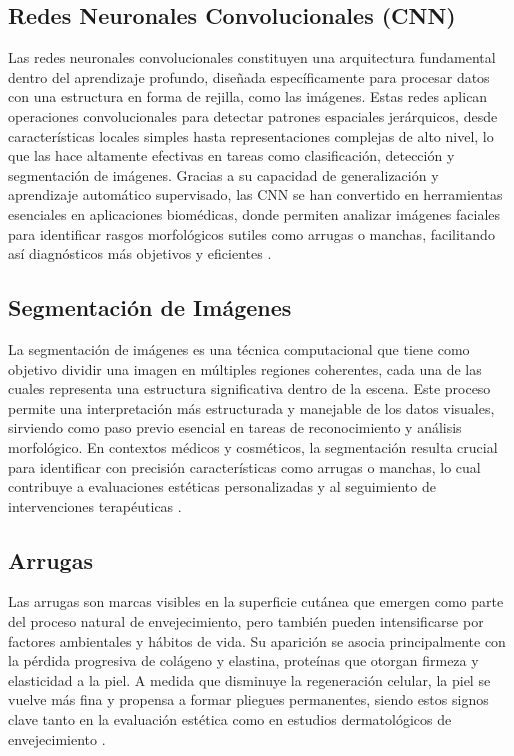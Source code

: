 
\subsection{Redes Neuronales Convolucionales (CNN)}

Las redes neuronales convolucionales constituyen una arquitectura fundamental dentro del aprendizaje profundo, diseñada específicamente para procesar datos con una estructura en forma de rejilla, como las imágenes. Estas redes aplican operaciones convolucionales para detectar patrones espaciales jerárquicos, desde características locales simples hasta representaciones complejas de alto nivel, lo que las hace altamente efectivas en tareas como clasificación, detección y segmentación de imágenes. Gracias a su capacidad de generalización y aprendizaje automático supervisado, las CNN se han convertido en herramientas esenciales en aplicaciones biomédicas, donde permiten analizar imágenes faciales para identificar rasgos morfológicos sutiles como arrugas o manchas, facilitando así diagnósticos más objetivos y eficientes \parencite{lecun1998gradient, krizhevsky2012, ronneberger2015}.

\subsection{Segmentación de Imágenes}
La segmentación de imágenes es una técnica computacional que tiene como objetivo dividir una imagen en múltiples regiones coherentes, cada una de las cuales representa una estructura significativa dentro de la escena. Este proceso permite una interpretación más estructurada y manejable de los datos visuales, sirviendo como paso previo esencial en tareas de reconocimiento y análisis morfológico. En contextos médicos y cosméticos, la segmentación resulta crucial para identificar con precisión características como arrugas o manchas, lo cual contribuye a evaluaciones estéticas personalizadas y al seguimiento de intervenciones terapéuticas \parencite{autor2020segmentacion}.

\subsection{Arrugas}

Las arrugas son marcas visibles en la superficie cutánea que emergen como parte del proceso natural de envejecimiento, pero también pueden intensificarse por factores ambientales y hábitos de vida. Su aparición se asocia principalmente con la pérdida progresiva de colágeno y elastina, proteínas que otorgan firmeza y elasticidad a la piel. A medida que disminuye la regeneración celular, la piel se vuelve más fina y propensa a formar pliegues permanentes, siendo estos signos clave tanto en la evaluación estética como en estudios dermatológicos de envejecimiento \parencite{autor2021arrugas}.

